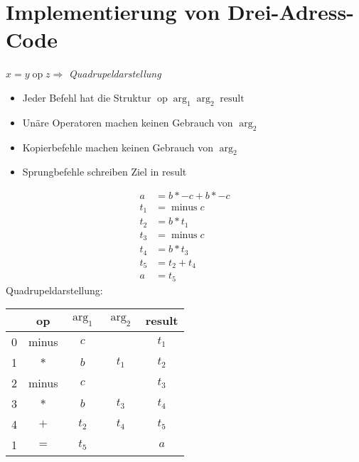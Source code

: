 \section{Implementierung von Drei-Adress-Code}
\Bsp $x = y \operatorname{op} z \Rightarrow$ \emph{Quadrupeldarstellung}
\begin{itemize}
 \item Jeder Befehl hat die Struktur $\operatorname{op} \operatorname{arg}_1 \operatorname{arg}_2 \operatorname{result}$
 \item Unäre Operatoren machen keinen Gebrauch von $\operatorname{arg}_2$
 \item Kopierbefehle machen keinen Gebrauch von $\operatorname{arg}_2$
 \item Sprungbefehle schreiben Ziel in result
\end{itemize}
\Bsp 
\begin{align*}
 a &= b * -c + b * -c \\
 t_1 &= \operatorname{minus} c \\
 t_2 &= b * t_1 \\
 t_3 &= \operatorname{minus} c \\
 t_4 &= b * t_3 \\
 t_5 &= t_2 + t_4 \\
 a &= t_5
\end{align*}
Quadrupeldarstellung:
\begin{center}
    \begin{tabular}{r|c|c|c|c}
          & op    & $\operatorname{arg}_1$ & $\operatorname{arg}_2$ & result \\\hline
        0 & minus & $c$                    &                        & $t_1$  \\\hline
        1 & $*$   & $b$                    & $t_1$                  & $t_2$  \\\hline
        2 & minus & $c$                    &                        & $t_3$  \\\hline
        3 & $*$   & $b$                    & $t_3$                  & $t_4$  \\\hline
        4 & $+$   & $t_2$                  & $t_4$                  & $t_5$  \\\hline
        1 & $=$   & $t_5$                  &                        & $a$    \\\hline
    \end{tabular}
\end{center}

